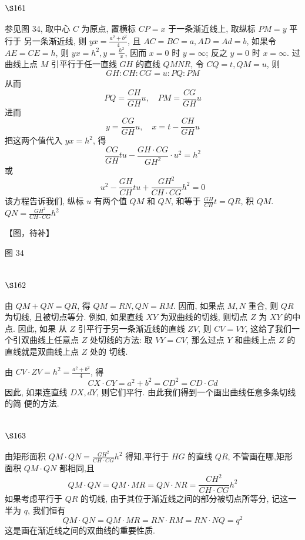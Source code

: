 \section{$\S 161$}

参见图 34, 取中心 $C$ 为原点, 置横标 $C P=x$ 于一条渐近线上, 取纵标 $P M=y$ 平行于 另一条渐近线, 则 $y x=\frac{a^{2}+b^{2}}{4}$, 且 $A C=B C=a, A D=A d=b$, 如果令 $A E=C E=h$, 则 $y x=h^{2}, y=\frac{h^{2}}{x}$, 因而 $x=0$ 时 $y=\infty$; 反之 $y=0$ 时 $x=\infty$. 过曲线上点 $M$ 引平行于任一直线 $G H$ 的直线 $Q M N R$, 令 $C Q=t, Q M=u$, 则
\[
G H: C H: C G=u: P Q: P M
\]
从而
\[
P Q=\frac{C H}{G H} u, \quad P M=\frac{C G}{G H} u
\]
进而
\[
y=\frac{C G}{G H} u, \quad x=t-\frac{C H}{G H} u
\]
把这两个值代入 $y x=h^{2}$, 得
\[
\frac{C G}{G H} t u-\frac{G H \cdot C G}{G H^{2}} \cdot u^{2}=h^{2}
\]
或
\[
u^{2}-\frac{G H}{C H} t u+\frac{G H^{2}}{C H \cdot C G} h^{2}=0
\]
该方程告诉我们, 纵标 $u$ 有两个值 $Q M$ 和 $Q N$, 和等于 $\frac{G H}{C H} t=Q R$, 积 $Q M$. $Q N=\frac{G H^{2}}{C H \cdot C G} h^{2}$


【图，待补】

图 34 

\section{$\S 162$}

由 $Q M+Q N=Q R$, 得 $Q M=R N, Q N=R M$. 因而, 如果点 $M, N$ 重合, 则 $Q R$ 为切线, 且被切点等分. 例如, 如果直线 $X Y$ 为双曲线的切线, 则切点 $Z$ 为 $X Y$ 的中点. 因此, 如果 从 $Z$ 引平行于另一条渐近线的直线 $Z V$, 则 $C V=V Y$, 这给了我们一个引双曲线上任意点 $Z$ 处切线的方法: 取 $V Y=C V$, 那么过点 $Y$ 和曲线上点 $Z$ 的直线就是双曲线上点 $Z$ 处的 切线.

由 $C V \cdot Z V=h^{2}=\frac{a^{2}+b^{2}}{4}$, 得
\[
C X \cdot C Y=a^{2}+b^{2}=C D^{2}=C D \cdot C d
\]
因此, 如果连直线 $D X, d Y$, 则它们平行. 由此我们得到一个画出曲线任意多条切线的简 便的方法.

\section{$\S 163$}

由矩形面积 $Q M \cdot Q N=\frac{G H^{2}}{C H \cdot C G} h^{2}$ 得知,平行于 $H G$ 的直线 $Q R$, 不管画在哪,矩形 面积 $Q M \cdot Q N$ 都相同,且
\[
Q M \cdot Q N=Q M \cdot M R=Q N \cdot N R=\frac{C H^{2}}{C H \cdot C G} h^{2}
\]
如果考虑平行于 $Q R$ 的切线, 由于其位于渐近线之间的部分被切点所等分, 记这一半为 $q$, 我们恒有
\[
Q M \cdot Q N=Q M \cdot M R=R N \cdot R M=R N \cdot N Q=q^{2}
\]
这是画在渐近线之间的双曲线的重要性质.

